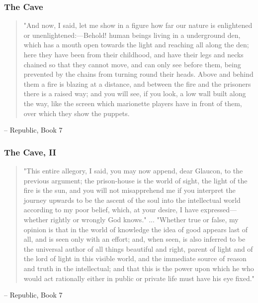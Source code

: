 \documentclass[aspectratio=169]{beamer}
\begin{document}
\begin{frame}
    \frametitle{The Cave}
    \begin{quotation}
    "And now, I said, let me show in a figure how far our nature is enlightened or unenlightened:—Behold! human beings living in a underground den, which has a mouth open towards the light and reaching all along the den; here they have been from their childhood, and have their legs and necks chained so that they cannot move, and can only see before them, being prevented by the chains from turning round their heads. Above and behind them a fire is blazing at a distance, and between the fire and the prisoners there is a raised way; and you will see, if you look, a low wall built along the way, like the screen which marionette players have in front of them, over which they show the puppets.
    
    \end{quotation}
    \vspace{0.5cm}
    \small{-- Republic, Book 7}
\end{frame}

\begin{frame}
    \frametitle{The Cave, II}
    \begin{quotation}
    "This entire allegory, I said, you may now append, dear Glaucon, to the previous argument; the prison-house is the world of sight, the light of the fire is the sun, and you will not misapprehend me if you interpret the journey upwards to be the ascent of the soul into the intellectual world according to my poor belief, which, at your desire, I have expressed—whether rightly or wrongly God knows."
    ... 
    "Whether true or false, my opinion is that in the world of knowledge the idea of good appears last of all, and is seen only with an effort; and, when seen, is also inferred to be the universal author of all things beautiful and right, parent of light and of the lord of light in this visible world, and the immediate source of reason and truth in the intellectual; and that this is the power upon which he who would act rationally either in public or private life must have his eye fixed."
    \end{quotation}
    \vspace{0.5cm}
    \small{-- Republic, Book 7}
\end{frame}
\end{document}
